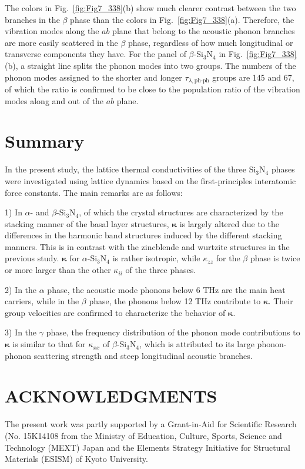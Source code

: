 \documentclass[twocolumn,amsmath,amssymb,a4paper,prb,superscriptaddress,floatfix]{revtex4-1}
\begin{document}
The colors in Fig.~\ref{fig:Fig7_338}(b)
show much clearer contrast between the two branches in the $\beta$ phase than
the colors in Fig.~\ref{fig:Fig7_338}(a). 
Therefore, the vibration
modes along the $ab$ plane that belong to the acoustic phonon branches are more
easily scattered in the $\beta$ phase, regardless of how much longitudinal or
transverse components they have.
For the panel of $\beta$-Si$_3$N$_4$ in
Fig.~\ref{fig:Fig7_338}(b), a straight line splits the phonon modes into two
groups. The numbers of the phonon modes assigned to the shorter and longer
$\tau_{\lambda,\text{ph-ph}}$ groups are 145 and 67, of which the ratio is confirmed
to be close to the population ratio of the vibration modes along and out of the
$ab$ plane.


\section{Summary}

In the present study, the lattice thermal conductivities of the
three Si$_3$N$_4$ phases were investigated using lattice dynamics based on the
first-principles interatomic force constants. The main remarks are as follows:

1) In $\alpha$- and $\beta$-Si$_3$N$_4$, of which the crystal structures are
characterized by the stacking manner of the basal layer structures,
$\boldsymbol{\kappa}$ is largely altered due to the differences in the harmonic
band structures induced by the different stacking manners. This is in contrast
with the zincblende and wurtzite structures in the previous
study\cite{phono3py}. $\boldsymbol{\kappa}$ for $\alpha$-Si$_3$N$_4$ is rather
isotropic, while $\kappa$$_{zz}$ for the $\beta$ phase is twice or more larger
than the other $\kappa_{ii}$ of the three phases.

2) In the $\alpha$ phase, the acoustic mode phonons below 6 THz are the main
heat carriers, while in the $\beta$ phase, the phonons below 12 THz contribute
to $\boldsymbol{\kappa}$. Their group velocities are confirmed to characterize
the behavior of $\boldsymbol{\kappa}$.

3) In the $\gamma$ phase, the frequency distribution of the phonon mode
contributions to $\boldsymbol{\kappa}$ is similar to that for $\kappa_{xx}$ of
$\beta$-Si$_3$N$_4$, which is attributed to its large phonon-phonon scattering
strength and steep longitudinal acoustic branches.



\section*{ACKNOWLEDGMENTS}
The present work was partly supported by a Grant-in-Aid for Scientific
Research (No. 15K14108 from the Ministry of Education, Culture, Sports, Science
and Technology (MEXT) Japan and the Elements Strategy Initiative for Structural
Materials (ESISM) of Kyoto University.
\end{document}
